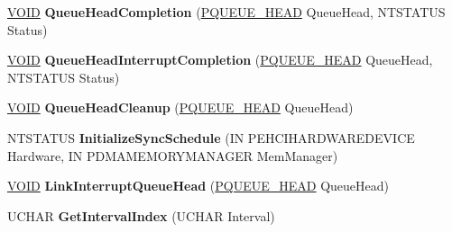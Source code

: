 \begin{DoxyCompactItemize}
\mbox{\label{class_c_u_s_b_queue_aab5099d6905a6a7b592eba293965f7bd}} 
\hyperlink{interfacevoid}{V\+O\+ID} {\bfseries Queue\+Head\+Completion} (\hyperlink{struct___q_u_e_u_e___h_e_a_d}{P\+Q\+U\+E\+U\+E\+\_\+\+H\+E\+AD} Queue\+Head, N\+T\+S\+T\+A\+T\+US Status)
\item 
\mbox{\label{class_c_u_s_b_queue_a7935e8adeedf4aa1c3aa1b49f7527d45}} 
\hyperlink{interfacevoid}{V\+O\+ID} {\bfseries Queue\+Head\+Interrupt\+Completion} (\hyperlink{struct___q_u_e_u_e___h_e_a_d}{P\+Q\+U\+E\+U\+E\+\_\+\+H\+E\+AD} Queue\+Head, N\+T\+S\+T\+A\+T\+US Status)
\item 
\mbox{\label{class_c_u_s_b_queue_a8fb9dcfd2c17bcc76cc951136dae5f0f}} 
\hyperlink{interfacevoid}{V\+O\+ID} {\bfseries Queue\+Head\+Cleanup} (\hyperlink{struct___q_u_e_u_e___h_e_a_d}{P\+Q\+U\+E\+U\+E\+\_\+\+H\+E\+AD} Queue\+Head)
\item 
\mbox{\label{class_c_u_s_b_queue_a3e9bbcb1ab56e5a3e2ae702650281ec0}} 
N\+T\+S\+T\+A\+T\+US {\bfseries Initialize\+Sync\+Schedule} (IN P\+E\+H\+C\+I\+H\+A\+R\+D\+W\+A\+R\+E\+D\+E\+V\+I\+CE Hardware, IN P\+D\+M\+A\+M\+E\+M\+O\+R\+Y\+M\+A\+N\+A\+G\+ER Mem\+Manager)
\item 
\mbox{\label{class_c_u_s_b_queue_a72cc3904f94e63bb204ccc13aeeba6e2}} 
\hyperlink{interfacevoid}{V\+O\+ID} {\bfseries Link\+Interrupt\+Queue\+Head} (\hyperlink{struct___q_u_e_u_e___h_e_a_d}{P\+Q\+U\+E\+U\+E\+\_\+\+H\+E\+AD} Queue\+Head)
\item 
\mbox{\label{class_c_u_s_b_queue_a6786c13237eca52294e774390ef7fad0}} 
U\+C\+H\+AR {\bfseries Get\+Interval\+Index} (U\+C\+H\+AR Interval)
\end{DoxyCompactItemize}

